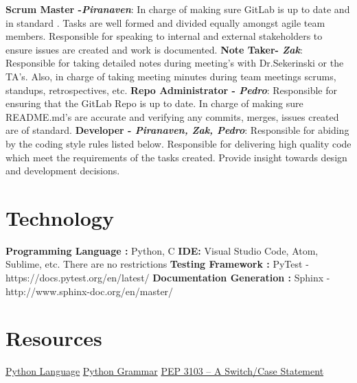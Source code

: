 \documentclass{article}
\begin{document}
\textbf{Scrum Master -\emph{Piranaven}}: In charge of making sure GitLab is up to date and in standard . Tasks are well formed and divided equally amongst agile team members. Responsible for  speaking to internal and external stakeholders to ensure issues are created and work is documented. \newline
\textbf{Note Taker- \emph{Zak}}:  Responsible for taking detailed notes during meeting's with Dr.Sekerinski or the TA's. Also, in charge of taking meeting minutes during team meetings  scrums, standups, retrospectives, etc. \newline
\textbf{Repo Administrator - \emph{Pedro}}:  Responsible for ensuring that the GitLab Repo is up to date. In charge of making sure README.md's are accurate and verifying any commits, merges, issues created are of standard.   \newline
\textbf{Developer - \emph{Piranaven, Zak, Pedro}}: Responsible for abiding by the coding style rules listed below. Responsible for delivering high quality code which meet the requirements of the tasks created. Provide insight towards design and development decisions.  \newline




\section{Technology}

\textbf{Programming Language :} Python, C\newline
\textbf{IDE:}  Visual Studio Code, Atom, Sublime, etc. There are no restrictions\newline 
\textbf{Testing Framework :} PyTest  - https://docs.pytest.org/en/latest/\newline
\textbf{Documentation Generation :} Sphinx - http://www.sphinx-doc.org/en/master/\newline 



\section{Resources}
\href{https://www.python.org}{Python Language}\newline
\href{https://docs.python.org/3/reference/grammar.html}{Python Grammar}\newline
\href{https://www.python.org/dev/peps/pep-3103/}{PEP 3103 -- A Switch/Case Statement}
\end{document}
